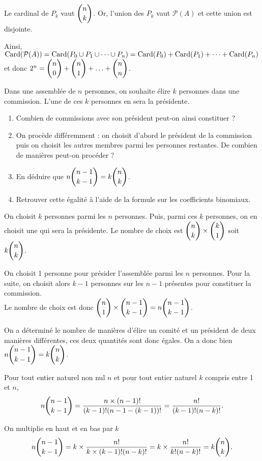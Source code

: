 \documentclass[11pt,fleqn, openany]{book} %
\begin{document}
\begin{solution}Le cardinal de $P_k$ vaut $\dbinom{n}{k}$. Or, l'union des $P_k$ vaut $\mathcal{P}(A)$ et cette union est disjointe.

Ainsi, $\mathrm{Card}(\mathcal{P}(A))=\mathrm{Card}(P_0 \cup P_1 \cup \dots \cup P_n)=\mathrm{Card}(P_0)+\mathrm{Card}(P_1) + \dots + \mathrm{Card}(P_n)$ et donc $2^n = \dbinom{n}{0} + \dbinom{n}{1} + \ldots + \dbinom{n}{n}$.\end{solution}




\begin{exercise}[topic=comb04]Dans une assemblée de $n$ personnes, on souhaite élire $k$ personnes dans une commission. L'une de ces $k$ personnes en sera la présidente.
\begin{enumerate}
\item Combien de commissions avec son président peut-on ainsi constituer ?
\item On procède différemment : on choisit d'abord le président de la commission puis on choisit les autres membres parmi les personnes restantes. De combien de manières peut-on procéder ?
\item En déduire que $n \dbinom{n-1}{k-1} = k \dbinom{n}{k}$.
\item Retrouver cette égalité à l'aide de la formule sur les coefficients binomiaux.\end{enumerate} \end{exercise}

\begin{solution}On choisit $k$ personnes parmi les $n$ personnes. Puis, parmi ces $k$ personnes, on en choisit une qui sera la présidente. Le nombre de choix est $\dbinom{n}{k} \times \dbinom{k}{1}$ soit $k \dbinom{n}{k}$.

 On choisit 1 personne pour présider l'assemblée parmi les $n$ personnes. Pour la suite, on choisit alors $k-1$ personnes sur les $n-1$ présentes pour constituer la commission.\\ Le nombre de choix est donc $\dbinom{n}{1} \times \dbinom{n-1}{k-1}=n \dbinom{n-1}{k-1}$.
 
 On a déterminé le nombre de manières d'élire un comité et un président de deux manières différentes, ces deux quantités sont donc égales. On a donc bien $ n \dbinom{n-1}{k-1} = k \dbinom{n}{k}$.
 
 Pour tout entier naturel non nul $n$ et pour tout entier naturel $k$ compris entre 1 et $n$,
\[ n \dbinom{n-1}{k-1} = \dfrac{n \times (n-1)!}{(k-1)!(n-1-(k-1))!}=\dfrac{n!}{(k-1)!(n-k)!}.\]

On multiplie en haut et en bas par $k$
\[  n \dbinom{n-1}{k-1}=k\times \dfrac{n!}{k\times (k-1)!(n-k)!}=k\times \dfrac{n!}{k!(n-k)!}= k \dbinom{n}{k} .\]\end{solution}
\end{document}
